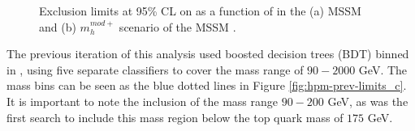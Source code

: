 		\begin{figure}[!ht]
			\centering
			\caption{\label{fig:hpm-tb-tanb-limits} Exclusion limits at 95\% CL on \tanb as a function of \mHpm in the (a) \gls{MSSM} and (b) $m^{mod+}_{h}$ scenario of the \gls{MSSM} \cite{Hpm-to-tb}. }
		\end{figure}


		The previous iteration of this analysis used boosted decision trees (BDT) binned in \mHpm, using five separate classifiers to cover the mass range of $90 - 2000$ GeV. The mass bins can be seen as the blue dotted lines in Figure \ref{fig:hpm-prev-limits_c}. It is important to note the inclusion of the mass range $90 - 200$ GeV, as \cite{hpm-previous} was the first search to include this mass region below the top quark mass of $175$ GeV.